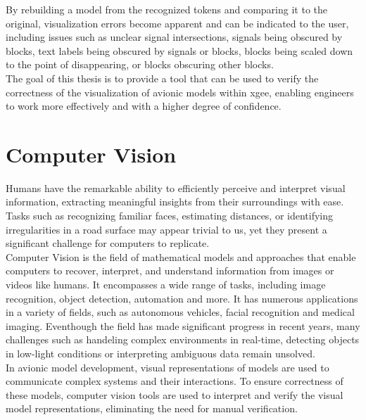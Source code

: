 By rebuilding a model from the recognized tokens and comparing it to the original, visualization errors become apparent and can be indicated to the user, including issues such as unclear signal intersections, signals being obscured by blocks, text labels being obscured by signals or blocks, blocks being scaled down to the point of disappearing, or blocks obscuring other blocks.\\
The goal of this thesis is to provide a tool that can be used to verify the correctness of the visualization of avionic models within \acrshort{xgee}, enabling engineers to work more effectively and with a higher degree of confidence.


\section{Computer Vision}
\label{sec:computer_vision}
Humans have the remarkable ability to efficiently perceive and interpret visual information, extracting meaningful insights from their surroundings with ease. Tasks such as recognizing familiar faces, estimating distances, or identifying irregularities in a road surface may appear trivial to us, yet they present a significant challenge for computers to replicate.\\
Computer Vision is the field of mathematical models and approaches that enable computers to recover, interpret, and understand information from images or videos like humans. It encompasses a wide range of tasks, including image recognition, object detection, automation and more. It has numerous applications in a variety of fields, such as autonomous vehicles, facial recognition and medical imaging. Eventhough the field has made significant progress in recent years, many challenges such as handeling complex environments in real-time, detecting objects in low-light conditions or interpreting ambiguous data remain unsolved.\\
In avionic model development, visual representations of models are used to communicate complex systems and their interactions. To ensure correctness of these models, computer vision tools are used to interpret and verify the visual model representations, eliminating the need for manual verification.

